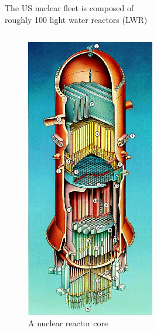 \documentclass{beamer}
\begin{document}
\begin{frame}{The US nuclear fleet is composed of \\ roughly 100 light water reactors (LWR)}
\begin{columns}[T]
                \begin{column}{0.5\textwidth}
                    \begin{figure}
                        \centering
                        \includegraphics[width=0.5\textwidth]{./img/bwrCore.png}
                        \caption*{A nuclear reactor core}
                    \end{figure}
                \end{column}

            \end{columns}

        \end{frame}
\end{document}
